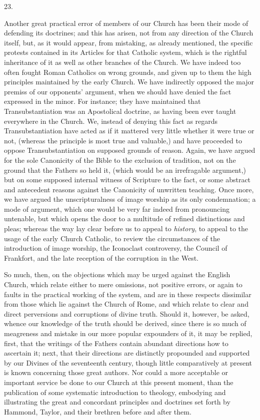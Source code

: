 23.

Another great practical error of members of our
Church has been their mode of defending its doctrines; and this has
arisen, not from any direction of the Church itself, but, as it would
appear, from mistaking, as already mentioned, the specific protests
contained in its Articles for that Catholic system, which is the
rightful inheritance of it as well as other branches of the Church. We
have indeed too often fought Roman Catholics on wrong grounds, and
given up to them the high principles maintained by the early Church.
We have indirectly opposed the major premiss of our opponents'
argument, when we should have denied the fact expressed in the minor.
For instance; they have maintained that Transubstantiation was an
Apostolical doctrine, as having been ever taught everywhere in the
Church. We, instead of denying this fact as regards Transubstantiation
have acted as if it mattered very little whether it were true or not,
(whereas the principle is most true and valuable,) and have proceeded
to oppose Transubstantiation on supposed grounds of reason. Again, we
have argued for the sole Canonicity of the Bible to the exclusion of
tradition, not on the ground that the Fathers so held it, (which would
be an irrefragable argument,) but on some supposed internal witness of
Scripture to the fact, or some abstract and antecedent reasons against
the Canonicity of unwritten teaching. Once more, we have argued the
unscripturalness of image worship as its only condemnation; a
mode of argument, which one would be very far indeed from pronouncing
untenable, but which opens the door to a multitude of refined
distinctions and pleas; whereas the way lay clear before us to appeal
to \emph{history}, to appeal to the usage of the early Church
Catholic, to review the circumstances of the introduction of image
worship, the Iconoclast controversy, the Council of Frankfort, and the
late reception of the corruption in the West.

So much, then, on the objections which may be
urged against the English Church, which relate either to mere
omissions, not positive errors, or again to faults in the practical
working of the system, and are in these respects dissimilar from those
which lie against the Church of Rome, and which relate to clear and
direct perversions and corruptions of divine truth. Should it,
however, be asked, whence our knowledge of the truth should be
derived, since there is so much of meagreness and mistake in our more
popular expounders of it, it may be replied, first, that the writings
of the Fathers contain abundant directions how to ascertain it; next,
that their directions are distinctly propounded and supported by our
Divines of the seventeenth century, though little comparatively at
present is known concerning those great authors. Nor could a more
acceptable or important service be done to our Church at this present
moment, than the publication of some systematic introduction to
theology, embodying and illustrating the great and concordant
principles and doctrines set forth by Hammond, Taylor, and their
brethren before and after them.

